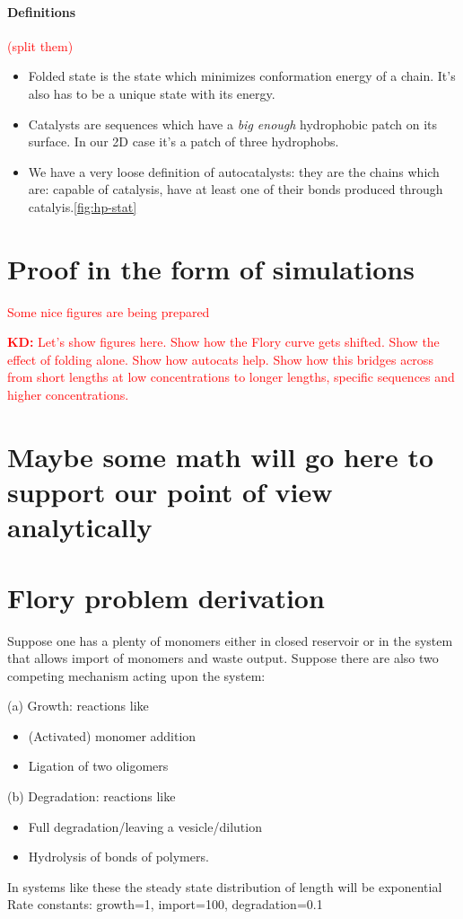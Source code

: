 \documentclass[12pt]{paper}
\newcommand{\red}[1]{\textcolor{red}{#1}}
\begin{document}
\paragraph{Definitions} \red{(split them)}
\begin{itemize}
  \item Folded state is the state which minimizes conformation energy of a chain. 
  It's also has to be a unique state with its energy.
  \item Catalysts are sequences which have a \textit{big enough} hydrophobic patch on its 
  surface. In our 2D case it's a patch of three hydrophobs.
  \item We have a very loose definition of autocatalysts:
  they are the chains which are: capable of catalysis, have at least one of their bonds produced 
  through catalyis.\ref{fig:hp-stat}
\end{itemize}


\section{Proof in the form of simulations}
\red{Some nice figures are being prepared}

\red {\textbf{KD:} Let’s show figures here.  Show how the Flory curve gets shifted.  Show the 
effect of folding alone.  Show how autocats help.  Show how this bridges across from short lengths 
at low concentrations to longer lengths, specific sequences and higher concentrations.}
\section{Maybe some math will go here to support our point of view analytically}


 \newpage
\appendix
\section{Flory problem derivation}\label{sec:flory}
Suppose one has a plenty of monomers either in closed reservoir or in the system that allows 
import of monomers and waste output. Suppose there are also two competing mechanism acting upon 
the system: 
\par (a) Growth: reactions like
\begin{itemize}
  \item (Activated) monomer addition
  \item Ligation of two oligomers
\end{itemize}
\par (b) Degradation: reactions like
\begin{itemize}
  \item Full degradation/leaving a vesicle/dilution
  \item Hydrolysis of bonds of polymers.
\end{itemize}
In systems like these the steady state distribution of length will be exponential
Rate constants: growth=1, import=100, degradation=0.1
\end{document}
